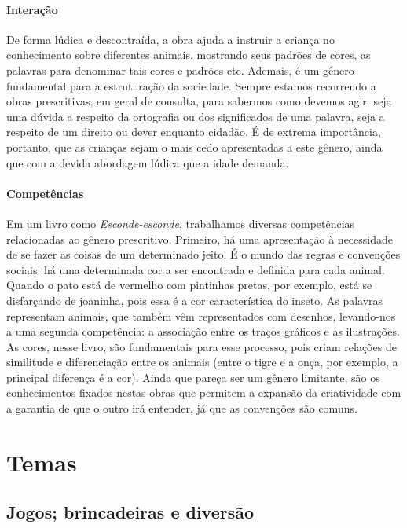 \documentclass[11pt]{extarticle}
\begin{document}
\paragraph{Interação} De forma lúdica e descontraída, a obra ajuda a instruir a criança no conhecimento sobre diferentes animais, mostrando seus padrões de cores, as palavras para denominar tais cores e padrões etc. Ademais, é um gênero fundamental para a estruturação da sociedade.
Sempre estamos recorrendo a obras prescritivas, em geral de consulta, para
sabermos como devemos agir: seja uma dúvida a respeito da ortografia ou 
dos significados de uma palavra, seja a respeito de um direito ou dever
enquanto cidadão. É de extrema importância, portanto, que as crianças
sejam o mais cedo apresentadas a este gênero, ainda que com a 
devida abordagem lúdica que a idade demanda.

\paragraph{Competências} Em um livro como
\emph{Esconde-esconde}, trabalhamos diversas competências relacionadas ao gênero prescritivo. 
Primeiro, há uma apresentação à necessidade de se fazer as coisas de um 
determinado jeito. É o mundo das regras e convenções sociais: há uma determinada cor a ser encontrada e definida para cada animal. Quando o pato está de vermelho com pintinhas pretas, por exemplo, está se disfarçando de joaninha, pois essa é a cor característica do inseto. As palavras representam animais, que também vêm representados com desenhos, levando-nos a uma segunda competência: a associação entre os traços gráficos e as ilustrações. As cores, nesse livro, são fundamentais para esse processo, pois criam relações de similitude e diferenciação entre os animais (entre o tigre e a onça, por exemplo, a principal diferença é a cor). Ainda que pareça ser um gênero
limitante, são os conhecimentos fixados nestas obras que permitem a expansão
da criatividade com a garantia de que o outro irá entender, já que as convenções são comuns.


\section{Temas}

\subsection{Jogos; brincadeiras e diversão}
\end{document}
